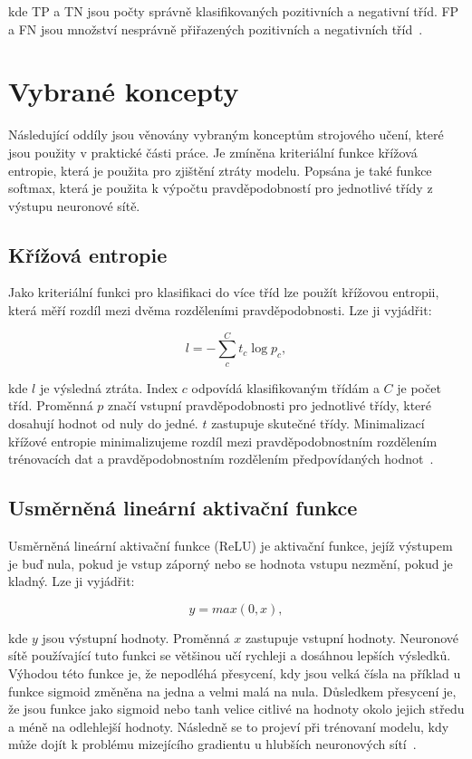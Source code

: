 \documentclass[FM,BP]{tulthesis}
\begin{document}
kde TP a TN jsou počty správně klasifikovaných pozitivních a negativní tříd. FP a FN jsou množství nesprávně přiřazených pozitivních a negativních tříd~\cite{burkov2019hundred}.

\section{Vybrané koncepty} %
Následující oddíly jsou věnovány vybraným konceptům strojového učení, které jsou použity v praktické části práce. Je zmíněna kriteriální funkce křížová entropie, která je použita pro zjištění ztráty modelu. Popsána je také funkce softmax, která je použita k výpočtu pravděpodobností pro jednotlivé třídy z výstupu neuronové sítě.

\subsection{Křížová entropie} %
Jako kriteriální funkci pro klasifikaci do více tříd lze použít křížovou entropii, která měří rozdíl mezi dvěma rozděleními pravděpodobnosti. Lze ji vyjádřit:

\begin{equation}
\label{eqn:cross_entropy}
l = -{\sum_{c}^{C}t_{c}\log p_{c}},
\end{equation}

kde $ l $ je výsledná ztráta. Index $ c $ odpovídá klasifikovaným třídám a $ C $ je počet tříd. Proměnná $ p $ značí vstupní pravděpodobnosti pro jednotlivé třídy, které dosahují hodnot od nuly do jedné. $ t $ zastupuje skutečné třídy. Minimalizací křížové entropie minimalizujeme rozdíl mezi pravděpodobnostním rozdělením trénovacích dat a pravděpodobnostním rozdělením předpovídaných hodnot~\cite{brownlee_2020}.

\subsection{Usměrněná lineární aktivační funkce} %
Usměrněná lineární aktivační funkce (ReLU) je aktivační funkce, jejíž výstupem je buď nula, pokud je vstup záporný nebo se hodnota vstupu nezmění, pokud je kladný. Lze ji vyjádřit:

\begin{equation}
\label{eqn:relu}
y = max(0, x),
\end{equation}

kde $ y $ jsou výstupní hodnoty. Proměnná $ x $ zastupuje vstupní hodnoty. Neuronové sítě používající tuto funkci se většinou učí rychleji a dosáhnou lepších výsledků. Výhodou této funkce je, že nepodléhá přesycení, kdy jsou velká čísla na příklad u funkce sigmoid změněna na jedna a velmi malá na nula. Důsledkem přesycení je, že jsou funkce jako sigmoid nebo tanh velice citlivé na hodnoty okolo jejich středu a méně na odlehlejší hodnoty. Následně se to projeví při trénovaní modelu, kdy může dojít k problému mizejícího gradientu u hlubších neuronových sítí~\cite{brownlee_2020_ReLU}.
\end{document}

